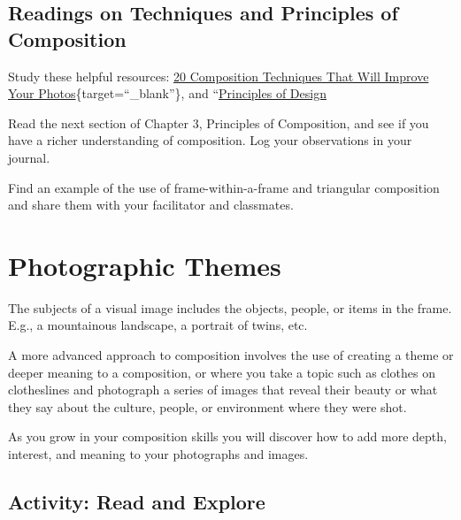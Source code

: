 \documentclass[
]{book}
\begin{document}
\hypertarget{readings-on-techniques-and-principles-of-composition}{%
\subsection*{Readings on Techniques and Principles of Composition}\label{readings-on-techniques-and-principles-of-composition}}

\begin{reflect}
Study these helpful resources: \href{https://petapixel.com/2016/09/14/20-composition-techniques-will-improve-photos/}{20 Composition Techniques That Will Improve Your Photos}\{target=``\_blank''\}, and ``\href{https://www.getty.edu/education/teachers/building_lessons/principles_design.pdf}{Principles of Design}

Read the next section of Chapter 3, Principles of Composition, and see if you have a richer understanding of composition. Log your observations in your journal.

Find an example of the use of frame-within-a-frame and triangular composition and share them with your facilitator and classmates.
\end{reflect}

\hypertarget{photographic-themes}{%
\section{Photographic Themes}\label{photographic-themes}}

The subjects of a visual image includes the objects, people, or items in the frame. E.g., a mountainous landscape, a portrait of twins, etc.

A more advanced approach to composition involves the use of creating a theme or deeper meaning to a composition, or where you take a topic such as clothes on clotheslines and photograph a series of images that reveal their beauty or what they say about the culture, people, or environment where they were shot.

As you grow in your composition skills you will discover how to add more depth, interest, and meaning to your photographs and images.

\hypertarget{activity-read-and-explore}{%
\subsection*{Activity: Read and Explore}\label{activity-read-and-explore}}
\end{document}
